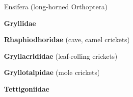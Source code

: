\documentclass[letterpaper,10pt]{article}
\begin{document}
{\makebox[0.20cm]{}  Ensifera (long-horned Orthoptera) \par
\makebox[0.6cm]{}  \textbf{Gryllidae} \par
\makebox[0.6cm]{}  \textbf{Rhaphiodhoridae} (cave, camel crickets)	\par
\makebox[0.6cm]{}  \textbf{Gryllacrididae} (leaf-rolling crickets) \par
\makebox[0.6cm]{}  \textbf{Gryllotalpidae} (mole crickets) \par
\makebox[0.6cm]{}  \textbf{Tettigoniidae} \par

}
\end{document}
